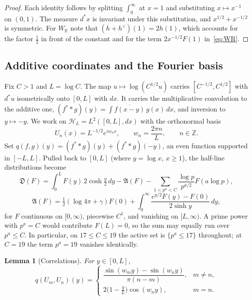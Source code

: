 \documentclass[11pt,a4paper]{article}
\newtheorem{lemma}[theorem]{Lemma}
\theoremstyle{definition}
\newcommand{\Z}{\mathbb{Z}}
\newcommand{\R}{\mathbb{R}}
\newcommand{\Arch}{\mathfrak{A}}
\newcommand{\Dist}{\mathfrak{D}}
\begin{document}
\begin{proof}
Each identity follows by splitting $\int_0^\infty$ at $x=1$ and substituting
$x\mapsto x^{-1}$ on $(0,1)$. The measure $d^{*}x$ is invariant under this
substitution, and $x^{1/2}+x^{-1/2}$ is symmetric. For $W_\R$ note that
$(h+h^{\vee})(1)=2h(1)$, which accounts for the factor $\tfrac12$ in front of
the constant and for the term $2x^{-1/2}F(1)$ in~\eqref{eq:WR}.
\end{proof}

\subsection{Additive coordinates and the Fourier basis}
Fix $C>1$ and $L=\log C$. The map $u\mapsto \log(C^{1/2}u)$ carries
$[C^{-1/2},C^{1/2}]$ with $d^{*}u$ isometrically onto $[0,L]$ with $dx$. It
carries the multiplicative convolution to the additive one,
$(f^{*}*g)(y)=\int\overline{f(x-y)}\,g(x)\,dx$, and inversion to $y\mapsto -y$.
We work on $\mathcal H_L=L^2([0,L],dx)$ with the orthonormal basis
\begin{equation}\label{eq:basis}
U_n(x)=L^{-1/2}e^{iw_nx},\qquad w_n=\frac{2\pi n}{L},\qquad n\in\Z.
\end{equation}
Set $q(f,g)(y)=(f^{*}*g)(y)+(f^{*}*g)(-y)$, an even function supported in
$[-L,L]$. Pulled back to $[0,L]$ (where $y=\log x$, $x\ge1$), the
half-line distributions become
\begin{equation}\label{eq:Dist}
\Dist(F)=\int_0^LF(y)\,2\cosh\tfrac y2\,dy-\Arch(F)-\sum_{1<p^a<C}\frac{\log p}{p^{a/2}}F(a\log p),
\end{equation}
\begin{equation}\label{eq:Arch}
\Arch(F)=\tfrac12(\log4\pi+\gamma)F(0)+\int_0^\infty\frac{e^{y/2}F(y)-F(0)}{2\sinh y}\,dy,
\end{equation}
for $F$ continuous on $[0,\infty)$, piecewise $C^1$, and vanishing on
$[L,\infty)$. A prime power with $p^a=C$ would contribute $F(L)=0$, so
the sum may equally run over $p^a\le C$. In particular, on
$17\le C\le 19$ the active set is $\{p^a\le17\}$ throughout; at $C=19$ the
term $p^a=19$ vanishes identically.

\begin{lemma}[Correlations]\label{lem:corr}
For $y\in[0,L]$,
\[
q(U_m,U_n)(y)=\begin{cases}\dfrac{\sin(w_my)-\sin(w_ny)}{\pi(n-m)},&m\ne n,\\[2mm]
2\bigl(1-\tfrac yL\bigr)\cos(w_ny),&m=n.\end{cases}
\]
\end{lemma}
\end{document}
